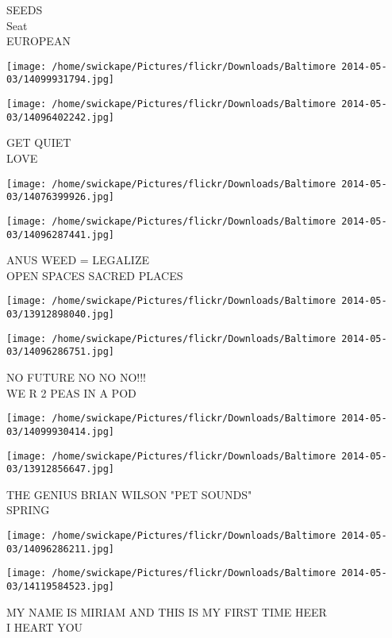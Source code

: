 \documentclass[10pt,letterpaper]{article}
\begin{document}
SEEDS\\
Seat\\
EUROPEAN
\pagebreak

\texttt{[image: /home/swickape/Pictures/flickr/Downloads/Baltimore 2014-05-03/14099931794.jpg]}

\vspace{0.25in}
\texttt{[image: /home/swickape/Pictures/flickr/Downloads/Baltimore 2014-05-03/14096402242.jpg]}

GET QUIET\\
LOVE
\pagebreak

\texttt{[image: /home/swickape/Pictures/flickr/Downloads/Baltimore 2014-05-03/14076399926.jpg]}

\vspace{0.25in}
\texttt{[image: /home/swickape/Pictures/flickr/Downloads/Baltimore 2014-05-03/14096287441.jpg]}

ANUS WEED = LEGALIZE\\
OPEN SPACES SACRED PLACES
\pagebreak

\texttt{[image: /home/swickape/Pictures/flickr/Downloads/Baltimore 2014-05-03/13912898040.jpg]}

\vspace{0.25in}
\texttt{[image: /home/swickape/Pictures/flickr/Downloads/Baltimore 2014-05-03/14096286751.jpg]}

NO FUTURE NO NO NO!!!\\
WE R 2 PEAS IN A POD
\pagebreak

\texttt{[image: /home/swickape/Pictures/flickr/Downloads/Baltimore 2014-05-03/14099930414.jpg]}

\vspace{0.25in}
\texttt{[image: /home/swickape/Pictures/flickr/Downloads/Baltimore 2014-05-03/13912856647.jpg]}

THE GENIUS BRIAN WILSON "PET SOUNDS"\\
SPRING
\pagebreak

\texttt{[image: /home/swickape/Pictures/flickr/Downloads/Baltimore 2014-05-03/14096286211.jpg]}

\vspace{0.25in}
\texttt{[image: /home/swickape/Pictures/flickr/Downloads/Baltimore 2014-05-03/14119584523.jpg]}

MY NAME IS MIRIAM AND THIS IS MY FIRST TIME HEER\\
I HEART YOU
\pagebreak
\end{document}
